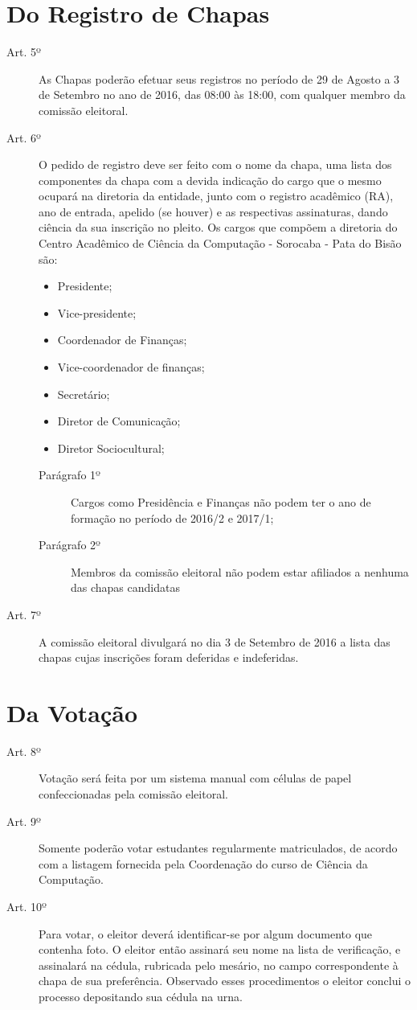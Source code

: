\documentclass[12pt]{article}
\begin{document}
\section*{Do Registro de Chapas}
\begin{description}
	\item[Art. 5º] As Chapas poderão efetuar seus registros no período de 29 de Agosto a 3 de Setembro no ano de 2016, das 08:00 às 18:00, com qualquer membro da comissão eleitoral.
	\item[Art. 6º] O pedido de registro deve ser feito com o nome da chapa, uma lista dos componentes da chapa com a devida indicação do cargo que o mesmo ocupará na diretoria da entidade, junto com o registro acadêmico (RA), ano de entrada, apelido (se houver) e as respectivas assinaturas, dando ciência da sua inscrição no pleito.
Os cargos que compõem a diretoria do Centro Acadêmico de Ciência da Computação - Sorocaba - Pata do Bisão são:
\begin{itemize}	
	\item Presidente;
	\item Vice-presidente;
	\item Coordenador de Finanças;
	\item Vice-coordenador de finanças;
	\item Secretário;
        \item Diretor de Comunicação;
	\item Diretor Sociocultural;
\end{itemize}
	\begin{description}
		\item[Parágrafo 1º] Cargos como Presidência e Finanças não podem ter o ano de formação no período de 2016/2 e 2017/1;
		\item[Parágrafo 2º] Membros da comissão eleitoral não podem estar afiliados a nenhuma das chapas candidatas
	\end{description}
	\item[Art. 7º] A comissão eleitoral divulgará no dia 3 de Setembro de 2016 a lista das chapas cujas inscrições foram deferidas e indeferidas.
\end{description}

\section*{Da Votação}
\begin{description}
	\item[Art. 8º] Votação será feita por um sistema manual com células de papel confeccionadas pela comissão eleitoral.
	\item[Art. 9º] Somente poderão votar estudantes regularmente matriculados, de acordo com a listagem fornecida pela Coordenação do curso de Ciência da Computação.
	\item[Art. 10º] Para votar, o eleitor deverá identificar-se por algum documento que contenha foto. O eleitor então assinará seu nome na lista de verificação, e assinalará na cédula, rubricada pelo mesário, no campo correspondente à chapa de sua preferência. Observado esses procedimentos o eleitor conclui o processo depositando sua cédula na urna.
\end{description}
\end{document}
